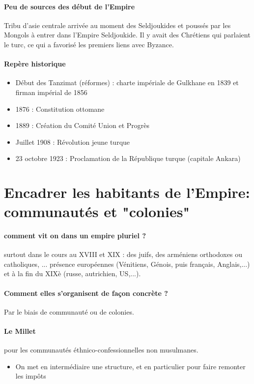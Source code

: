 \paragraph{Peu de sources des début de l'Empire} Tribu d'asie centrale arrivée au moment des Seldjoukides et poussés par les Mongols à entrer dans l'Empire Seldjoukide.
Il y avait des Chrétiens qui parlaient le turc, ce qui a favorisé les premiers liens avec Byzance.



\paragraph{Repère historique}

\begin{itemize}
    \item  
Début des
Tanzimat (réformes) : charte impériale de Gulkhane en
1839 et firman impérial de 1856
    \item  
1876 : Constitution ottomane
    \item  
1889 : Création du Comité Union et Progrès
    \item  
Juillet 1908 : Révolution jeune
turque
    \item  
23 octobre
1923 : Proclamation de la République turque (capitale
Ankara)
\end{itemize}
\section{Encadrer les habitants de l'Empire: communautés et "colonies"}

\paragraph{comment vit on dans un empire pluriel ? } surtout dans le cours au XVIII et XIX : des juifs, des arméniens orthodoxes ou catholiques, ... présence européennes (Vénitiens, Génois, puis français, Anglais,...) et à la fin du XIXè (russe, autrichien, US,...). 

\paragraph{Comment elles s'organisent de façon concrète ? } 
Par le biais de communauté ou de colonies.

\paragraph{Le Millet} pour les communautés éthnico-confessionnelles non musulmanes. 
\begin{itemize}
    \item On met en intermédiaire une structure, et en particulier pour faire remonter les impôts
\end{itemize}


